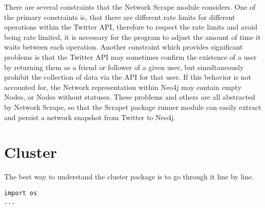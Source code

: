 There are several constraints that the Network Scrape module
considers. One of the primary constraints is, that there are different
rate limits for different operations within the Twitter API, therefore
to respect the rate limits and avoid being rate limited, it is
necessary for the program to adjust the amount of time it waits
between each operation. Another constraint which provides significant
problems is that the Twitter API may sometimes confirm the existence
of a user by returning them as a friend or follower of a given user,
but simultaneously prohibit the collection of data via the API for
that user. If this behavior is not accounted for, the Network
representation within Neo4j may contain empty Nodes, or Nodes without
statuses. These problems and others are all abstracted by Network
Scrape, so that the Scrapet package runner module can easily extract
and persist a network snapshot from Twitter to Neo4j.

\section{Cluster}
The best way to understand the cluster package is to go through it
line by line.

\begin{lstlisting}
import os
...
\end{lstlisting}
